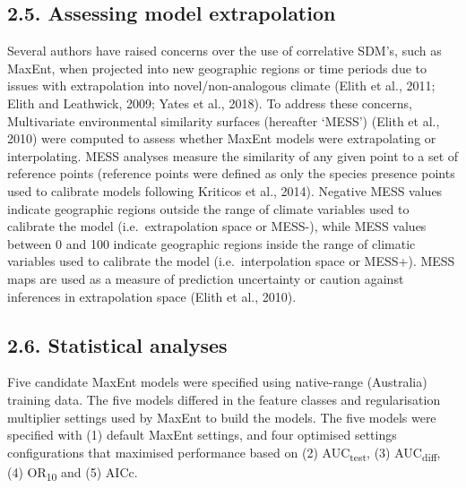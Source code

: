 \documentclass[12pt,]{article}
\begin{document}
\hypertarget{assessing-model-extrapolation}{%
\subsection{2.5. Assessing model
extrapolation}\label{assessing-model-extrapolation}}

Several authors have raised concerns over the use of correlative SDM's,
such as MaxEnt, when projected into new geographic regions or time
periods due to issues with extrapolation into novel/non-analogous
climate (Elith et al., 2011; Elith and Leathwick, 2009; Yates et al.,
2018). To address these concerns, Multivariate environmental similarity
surfaces (hereafter `MESS') (Elith et al., 2010) were computed to assess
whether MaxEnt models were extrapolating or interpolating. MESS analyses
measure the similarity of any given point to a set of reference points
(reference points were defined as only the species presence points used
to calibrate models following Kriticos et al., 2014). Negative MESS
values indicate geographic regions outside the range of climate
variables used to calibrate the model (i.e.~extrapolation space or
MESS-), while MESS values between 0 and 100 indicate geographic regions
inside the range of climatic variables used to calibrate the model
(i.e.~interpolation space or MESS+). MESS maps are used as a measure of
prediction uncertainty or caution against inferences in extrapolation
space (Elith et al., 2010).

\hypertarget{statistical-analyses}{%
\subsection{2.6. Statistical analyses}\label{statistical-analyses}}

Five candidate MaxEnt models were specified using native-range
(Australia) training data. The five models differed in the feature
classes and regularisation multiplier settings used by MaxEnt to build
the models. The five models were specified with (1) default MaxEnt
settings, and four optimised settings configurations that maximised
performance based on (2) AUC\textsubscript{test}, (3)
AUC\textsubscript{diff}, (4) OR\textsubscript{10} and (5) AICc.
\end{document}

